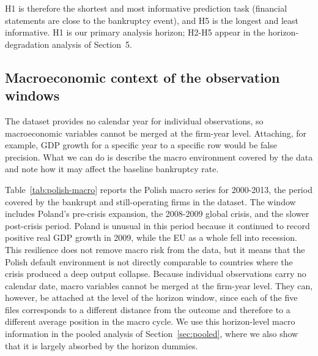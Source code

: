\documentclass[12pt,a4paper]{article}
\begin{document}
\noindent H1 is therefore the shortest and most informative prediction task
(financial statements are close to the bankruptcy event), and H5 is the
longest and least informative. H1 is our primary analysis horizon; H2-H5
appear in the horizon-degradation analysis of Section~5.

\subsection{Macroeconomic context of the observation windows}
\label{sec:macro-context}

The dataset provides no calendar year for individual observations, so
macroeconomic variables cannot be merged at the firm-year level. Attaching,
for example, GDP growth for a specific year to a specific row would be
false precision. What we can do is describe the macro environment covered
by the data and note how it may affect the baseline bankruptcy rate.

Table~\ref{tab:polish-macro} reports the Polish macro series for 2000-2013,
the period covered by the bankrupt and still-operating firms in the dataset.
The window includes Poland's pre-crisis expansion, the 2008-2009 global crisis,
and the slower post-crisis period. Poland is unusual in this period because it
continued to record positive real GDP growth in 2009, while the EU as a whole
fell into recession. This resilience does not remove macro risk from the data,
but it means that the Polish default environment is not directly comparable to
countries where the crisis produced a deep output collapse. Because individual
observations carry no calendar date, macro variables cannot be merged at the
firm-year level. They can, however, be attached at the level of the horizon
window, since each of the five files corresponds to a different distance from
the outcome and therefore to a different average position in the macro cycle.
We use this horizon-level macro information in the pooled analysis of
Section~\ref{sec:pooled}, where we also show that it is largely absorbed by
the horizon dummies.
\end{document}
